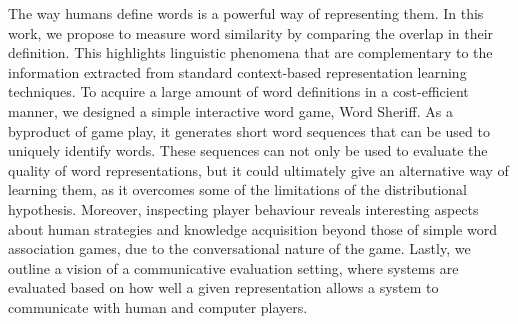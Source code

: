 The way humans define words is a powerful way of representing them.  In this work, we propose to measure word similarity by comparing the overlap in their definition.  This highlights linguistic phenomena that are complementary to the information extracted from standard context-based representation learning techniques.  To acquire a large amount of word definitions in a cost-efficient manner, we designed a simple interactive word game, Word Sheriff.  As a byproduct of game play, it generates short word sequences that can be used to uniquely identify words.  These sequences can not only be used to evaluate the quality of word representations, but it could ultimately give an alternative way of learning them, as it overcomes some of the limitations of the distributional hypothesis.  Moreover, inspecting player behaviour reveals interesting aspects about human strategies and knowledge acquisition beyond those of simple word association games, due to the conversational nature of the game.  Lastly, we outline a vision of a communicative evaluation setting, where systems are evaluated based on how well a given representation allows a system to communicate with human and computer players.
